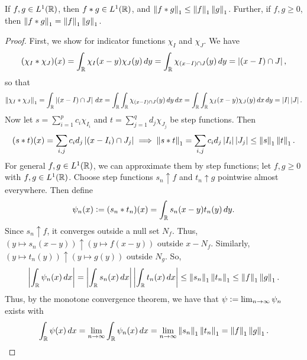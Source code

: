 \begin{theorem}
    If $f,g \in L^{1}(\mathbb{R})$, then $f \ast g \in L^{1}(\mathbb{R})$, and $\left\lVert f \ast g\right\rVert_{1} \leq \left\lVert f\right\rVert_{1}\left\lVert g\right\rVert_{1}$. Further, if $f,g \geq 0$, then $\left\lVert f \ast g\right\rVert_{1} = \left\lVert f\right\rVert_{1}\left\lVert g\right\rVert_{1}$.
\end{theorem}
\begin{proof}
    First, we show for indicator functions $\chi_{I}$ and $\chi_{J}$. We have
    \begin{align}
        (\chi_{I} \ast \chi_{J})(x) = \int_{\mathbb{R}} \chi_{I}(x-y)\chi_{J}(y) \, dy = \int_{\mathbb{R}} \chi_{(x-I)\cap J}(y) \, dy = \left| (x-I) \cap J \right|,
    \end{align}
    so that
    \begin{align}
        \left\lVert\chi_{I} \ast \chi_{J}\right\rVert_{1} = \int_{\mathbb{R}} \left| (x-I) \cap J \right| \, dx = \int_{\mathbb{R}} \int_{\mathbb{R}} \chi_{(x-I) \cap J}(y) \, dy \, dx = \int_{\mathbb{R}} \int_{\mathbb{R}} \chi_{I}(x-y)\chi_{J}(y) \, dx \, dy = \left| I \right|\left| J \right|.
    \end{align}
    Now let $s = \sum_{i=1}^{p} c_{i}\chi_{I_{i}}$ and $t = \sum_{j=1}^{q} d_{j}\chi_{J_{j}}$ be step functions. Then
    \begin{align}
        (s \ast t)(x) = \sum_{i,j} c_{i}d_{j}\left| (x-I_{i}) \cap J_{j} \right| \implies \left\lVert s \ast t\right\rVert_{1} = \sum_{i,j} c_{i}d_{j}\left| I_{i} \right|\left| J_{j} \right| \leq \left\lVert s\right\rVert_{1}\left\lVert t\right\rVert_{1}.
    \end{align}
    For general $f,g \in L^{1}(\mathbb{R})$, we can approximate them by step functions; let $f,g \geq 0$ with $f,g \in L^{1}(\mathbb{R})$. Choose step functions $s_{n} \uparrow f$ and $t_{n} \uparrow g$ pointwise almost everywhere. Then define
    \begin{align}
        \psi_{n}(x) \vcentcolon= (s_{n} \ast t_{n})(x) = \int_{\mathbb{R}} s_{n}(x-y)t_{n}(y) \, dy.
    \end{align}
    Since $s_{n} \uparrow f$, it converges outside a null set $N_{f}$. Thus, $(y \mapsto s_{n}(x-y)) \uparrow (y \mapsto f(x-y))$ outside $x-N_{f}$. Similarly, $(y \mapsto t_{n}(y)) \uparrow (y \mapsto g(y))$ outside $N_{g}$. So,
    \begin{align}
        \left| \int_{\mathbb{R}}\psi_{n}(x) \, dx \right| = \left| \int_{\mathbb{R}} s_{n}(x) \, dx \right|\left| \int_{\mathbb{R}} t_{n}(x) \, dx \right| \leq \left\lVert s_{n}\right\rVert_{1}\left\lVert t_{n}\right\rVert_{1} \leq \left\lVert f\right\rVert_{1}\left\lVert g\right\rVert_{1}.
    \end{align}
    Thus, by the monotone convergence theorem, we have that $\psi \vcentcolon= \lim_{n \to \infty} \psi_{n}$ exists with
    \begin{align}
        \int_{\R} \psi(x) \, dx = \lim_{n \to \infty} \int_{\R} \psi_{n}(x) \, dx = \lim_{n \to \infty} \norm{s_{n}}_{1}\norm{t_{n}}_{1} = \norm{f}_{1}\norm{g}_{1}.

\end{align}
\end{proof}
